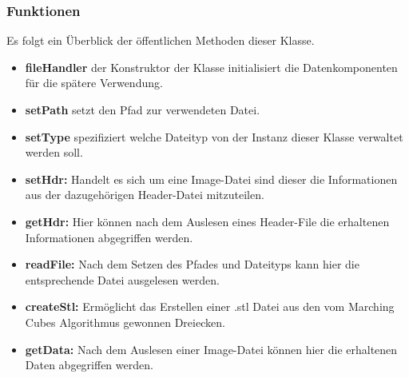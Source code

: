\subsubsection{Funktionen}
Es folgt ein Überblick der öffentlichen Methoden dieser Klasse.\\
\begin{itemize}
	\item \textbf{fileHandler} der Konstruktor der Klasse initialisiert die Datenkomponenten für die spätere Verwendung.
	\item \textbf{setPath} setzt den Pfad zur verwendeten Datei.
	\item \textbf{setType} spezifiziert welche Dateityp von der Instanz dieser Klasse verwaltet werden soll.
	\item \textbf{setHdr:} Handelt es sich um eine Image-Datei sind dieser die Informationen aus der dazugehörigen Header-Datei mitzuteilen. 
	\item \textbf{getHdr:} Hier können nach dem Auslesen eines Header-File die erhaltenen Informationen abgegriffen werden. 
	\item \textbf{readFile:} Nach dem Setzen des Pfades und Dateityps kann hier die entsprechende Datei ausgelesen werden.
	\item \textbf{createStl:} Ermöglicht das Erstellen einer .stl Datei aus den vom Marching Cubes Algorithmus gewonnen Dreiecken. 
	\item \textbf{getData:} Nach dem Auslesen einer Image-Datei können hier die erhaltenen Daten abgegriffen werden.
\end{itemize}
